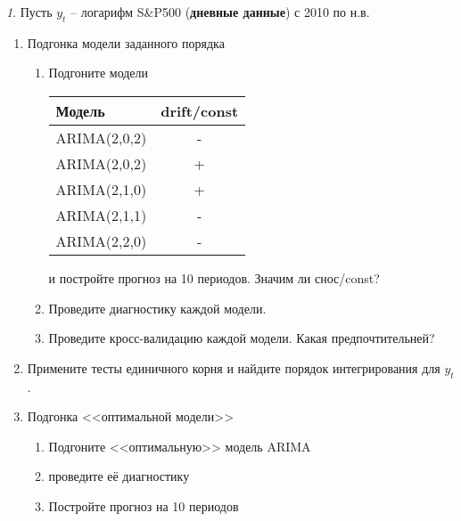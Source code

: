 \documentclass[12pt]{article}
\theoremstyle{remark}
\newtheorem{exercise}{}[subsection]
\begin{document}
\begin{exercise}
Пусть \(y_t\) -- логарифм S\&P500 (\textbf{дневные данные}) с 2010 по н.в.
\begin{enumerate}
	\item Подгонка модели заданного порядка
		\begin{enumerate}
			\item Подгоните модели
			\begin{center}
			\begin{tabular}{l|c}
				Модель & drift/const \\ \hline
				ARIMA(2,0,2) & - \\
				ARIMA(2,0,2) & + \\
				ARIMA(2,1,0) & + \\
				ARIMA(2,1,1) & - \\
				ARIMA(2,2,0) & - \\ \hline
			\end{tabular}
			\end{center} 
			и постройте прогноз на 10 периодов. Значим ли снос/const?
			\item Проведите диагностику каждой модели.
			\item Проведите кросс-валидацию каждой модели. Какая предпочтительней?
		\end{enumerate}
		\item Примените тесты единичного корня и найдите порядок интегрирования для \(y_t\). 
		\item Подгонка <<оптимальной модели>>
		\begin{enumerate}
			\item Подгоните <<оптимальную>> модель ARIMA
			\item проведите её диагностику
			\item Постройте прогноз на 10 периодов
		\end{enumerate}
	\end{enumerate}
	\end{exercise}


\end{document}
